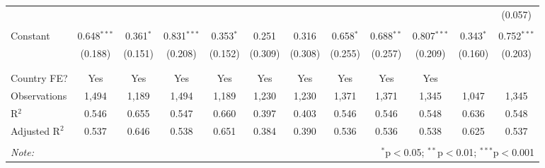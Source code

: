 \begin{table}[!htbp]
\begin{tabular}{@{\extracolsep{5pt}}lccccccccccc}
  &  &  &  &  &  &  &  &  &  &  & (0.057) \\ 
  & & & & & & & & & & & \\ 
 Constant & 0.648$^{***}$ & 0.361$^{*}$ & 0.831$^{***}$ & 0.353$^{*}$ & 0.251 & 0.316 & 0.658$^{*}$ & 0.688$^{**}$ & 0.807$^{***}$ & 0.343$^{*}$ & 0.752$^{***}$ \\ 
  & (0.188) & (0.151) & (0.208) & (0.152) & (0.309) & (0.308) & (0.255) & (0.257) & (0.209) & (0.160) & (0.203) \\ 
  & & & & & & & & & & & \\ 
\hline \\[-1.8ex] 
Country FE? & Yes & Yes & Yes & Yes & Yes & Yes & Yes & Yes & Yes &  &  \\ 
Observations & 1,494 & 1,189 & 1,494 & 1,189 & 1,230 & 1,230 & 1,371 & 1,371 & 1,345 & 1,047 & 1,345 \\ 
R$^{2}$ & 0.546 & 0.655 & 0.547 & 0.660 & 0.397 & 0.403 & 0.546 & 0.546 & 0.548 & 0.636 & 0.548 \\ 
Adjusted R$^{2}$ & 0.537 & 0.646 & 0.538 & 0.651 & 0.384 & 0.390 & 0.536 & 0.536 & 0.538 & 0.625 & 0.537 \\ 
\hline 
\hline \\[-1.8ex] 
\textit{Note:}  & \multicolumn{11}{r}{$^{*}$p$<$0.05; $^{**}$p$<$0.01; $^{***}$p$<$0.001} \\ 
\end{tabular} 
\end{table} 
